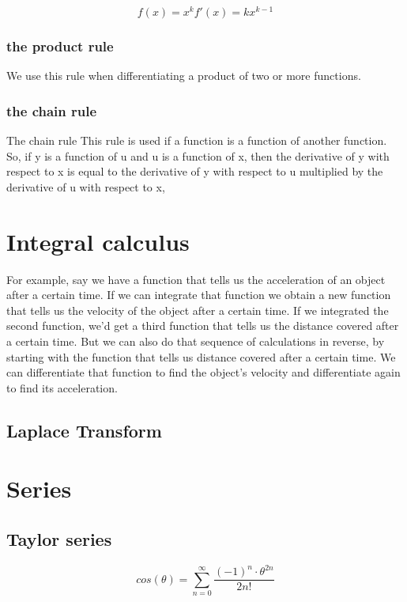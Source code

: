 \[
f(x) = x^k 
f'(x) = kx^{k-1}
\]

\subsubsection{the product rule}
We use this rule when differentiating a product of two or more functions.

\subsubsection{the chain rule}
The chain rule This rule is used if a function is a function of another function. So, if y is a function of u and u is a function of x, then the derivative of y with respect to x is equal to the derivative of y with respect to u multiplied by the derivative of u with respect to x,

\section{Integral calculus}
For example, say we have a function that tells us the acceleration of an object after a certain time. If we can integrate that function we obtain a new function that tells us the velocity of the object after a certain time. If we integrated the second function, we'd get a third function that tells us the distance covered after a certain time. But we can also do that sequence of calculations in reverse, by starting with the function that tells us distance covered after a certain time. We can differentiate that function to find the object's velocity and differentiate again to find its acceleration.

\subsection{Laplace Transform}


\section{Series}

\subsection{Taylor series}
\begin{equation}
cos(\theta) = \sum_{n=0}^{\infty} \frac{(-1)^n \cdot \theta^{2n}}{2n!}
\end{equation}

